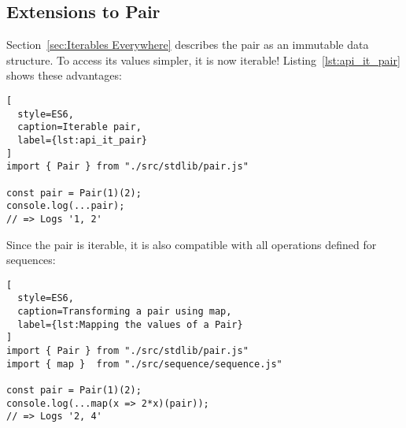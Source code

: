 \subsection{Extensions to Pair} %
\label{sub:Extensions to Pair}
Section~\ref{sec:Iterables Everywhere} describes the pair as an immutable
data structure. To access its values simpler, it is now iterable!
Listing~\ref{lst:api_it_pair} shows these advantages:

\begin{lstlisting}[
  style=ES6,
  caption=Iterable pair,
  label={lst:api_it_pair}
]
import { Pair } from "./src/stdlib/pair.js"

const pair = Pair(1)(2);
console.log(...pair);
// => Logs '1, 2'
\end{lstlisting}

Since the pair is iterable, it is also compatible with all operations defined
for sequences:

\begin{lstlisting}[
  style=ES6,
  caption=Transforming a pair using map,
  label={lst:Mapping the values of a Pair}
]
import { Pair } from "./src/stdlib/pair.js"
import { map }  from "./src/sequence/sequence.js"

const pair = Pair(1)(2);
console.log(...map(x => 2*x)(pair));
// => Logs '2, 4'
\end{lstlisting}


